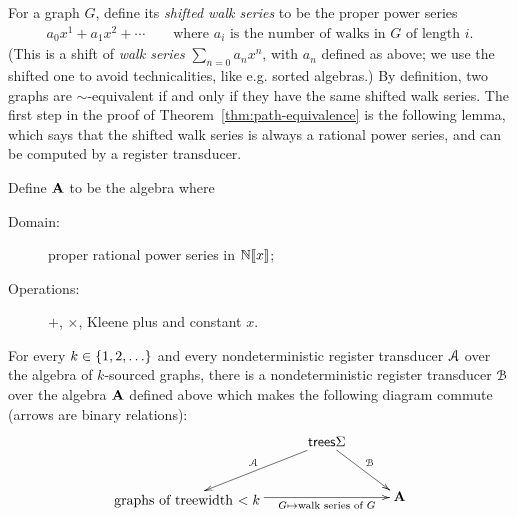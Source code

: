 For a graph $G$, define its \emph{shifted walk series} to be the proper power series 
\begin{align*}
  a_0 x^1 + a_1 x^2 + \cdots \qquad \text{where $a_i$ is the number of walks in $G$ of length $i$.}
\end{align*}
(This is a shift of \emph{walk series} $\sum_{n=0}a_nx^n$, with $a_n$ defined as above; we use the shifted one to avoid technicalities, like e.g. sorted algebras.)
By definition, two graphs are $\sim$-equivalent if and only if they have the same shifted walk series. 
The first step in the proof of Theorem~\ref{thm:path-equivalence} is the following lemma, which says that the shifted walk series is always a rational power series, and can be computed by a register transducer.
\begin{lemma}\label{lem:compute-power-series}    
    Define  $\mathbf{A}$ to be the  algebra where
    \begin{description}
        \item[Domain:] proper rational power series in $\mathbb N [\![x]\!]$;
        \item[Operations:] $+$, $\times$, Kleene plus and constant $x$.
    \end{description}
    For every $k \in \{1,2,\ldots\}$ and every nondeterministic register transducer ${{\mathcal A}}$ over the algebra of $k$-sourced graphs, there is a  nondeterministic register transducer ${\mathcal B}$ over the algebra  $\mathbf{A}$ defined above which makes the following diagram commute (arrows are binary relations):
    \begin{align*}
    \xymatrix@C=1cm{
       &  \trees \Sigma   
        \ar[dr]^{\Bb}
        \ar[dl]_{\Aa} \\
        \txt{graphs of
        treewidth $< k$} \ar[rr]_-{G \mapsto \text{walk series of $G$}}& & \aalg
    }
    \end{align*}
\end{lemma}
